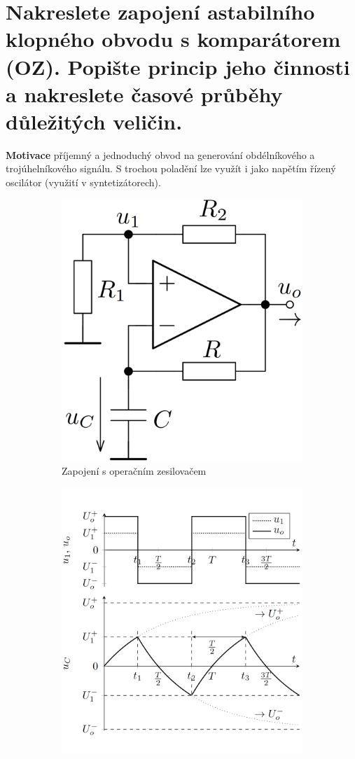 \documentclass[a4paper,12pt]{article}   %
\begin{document}
\section{Nakreslete zapojení astabilního klopného obvodu s komparátorem (OZ). Popište princip jeho činnosti a nakreslete časové průběhy důležitých veličin.}
\textbf{Motivace} příjemný a jednoduchý obvod na generování obdélníkového a trojúhelníkového signálu. S trochou poladění lze využít i jako napětím řízený oscilátor (využití v syntetizátorech).

\begin{figure}[h!]
    \centering
    \begin{subfigure}{.4\textwidth}
        \centering
        \includegraphics[width=.8\textwidth]{astab_klop.PNG}
        \caption{Zapojení s operačním zesilovačem}
        \label{sch:astab:kl}
    \end{subfigure}
    \hspace{2em}%
    \begin{subfigure}{.4\textwidth}
        \centering
        \includegraphics[width =.8\textwidth]{astab_klop-prubehy.PNG}

\end{subfigure}
\end{figure}
\end{document}
